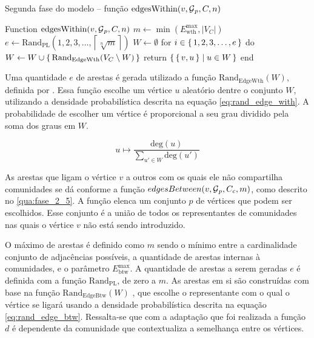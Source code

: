 \documentclass[notes.tex]{subfiles}
\begin{document}
\begin{quadro}[htbp]
\caption{Segunda fase do modelo -- função $\text{edgesWithin}(v, \operatorname{\mathcal{G}}_p, C, n)$}
\label{qua:fase_2_4}
\begin{algorithm}
Function $\text{edgesWithin}(v, \operatorname{\mathcal{G}}_p, C, n)$
    $m \leftarrow \min( E_\text{wth}^\text{max}, |V_C| )$
    $e \leftarrow \text{Rand}_\text{PL}({1, 2, 3, \ldots, \left\lceil  \sqrt[n]{m} \right\rceil})$
    $W \leftarrow \emptyset$
    for $i \in \set{1, 2, 3, \ldots, e}$ do $W\leftarrow W \cup \set{\text{Rand}_\text{EdgeWth}(V_C \setminus W)}$
    return $\set{\set{v, u} | u \in W}$
end
\end{algorithm}
\end{quadro}

Uma quantidade $e$ de arestas é gerada utilizado a função $\text{Rand}_\text{EdgeWth}(W)$, definida por .
Essa função escolhe um vértice $u$ aleatório dentre o conjunto $W$, utilizando a densidade probabilística descrita na equação \ref{eq:rand_edge_with}.
A probabilidade de escolher um vértice é proporcional a seu grau dividido pela soma dos graus em $W$.

\begin{equation}\label{eq:rand_edge_with}
    u \mapsto \frac{\text{deg}(u)}{\displaystyle\sum_{u' \in W}^{}\text{deg}(u')}
\end{equation}

As arestas que ligam o vértice $v$ a outros com os quais ele não compartilha comunidades se dá conforme a função $edgesBetween(v, \operatorname{\mathcal{G}}_p, C_c, m)$, como descrito no \autoref{qua:fase_2_5}.
A função elenca um conjunto $p$ de vértices que podem ser escolhidos.
Esse conjunto é a união de todos os representantes de comunidades nas quais o vértice $v$ não está sendo introduzido.

O máximo de arestas é definido como $m$ sendo o mínimo entre a cardinalidade conjunto de adjacências possíveis, a quantidade de arestas internas à comunidades, e o parâmetro $E_\text{btw}^\text{max}$.
A quantidade de arestas a serem geradas $e$ é  definida com a função $\text{Rand}_\text{PL}$, de zero a $m$.
As arestas em si são construídas com base na função $\text{Rand}_\text{EdgeBtw}(W)$ \cite{largeron2015generating}, que escolhe o representante com o qual o vértice se ligará usando a densidade probabilística descrita na equação \ref{eq:rand_edge_btw}.
Ressalta-se que com a adaptação que foi realizada a função $d$ é dependente da comunidade que contextualiza a semelhança entre os vértices.
\end{document}

